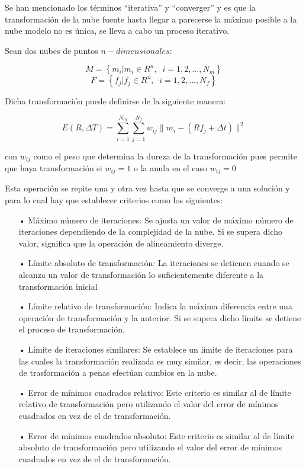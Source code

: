 Se han mencionado los términos ``iterativa'' y ``converger'' y es que la transformación de la nube fuente hasta llegar a parecerse la máximo posible a la nube modelo no es única, se lleva a cabo un proceso iterativo. 

Sean dos nubes de puntos $n-dimensionales$:

$$M=\left\lbrace m_{i} | m_{i} \in R^n,\;\;i=1,2,...,N_{m} \right\rbrace$$
$$F=\left\lbrace f_{j} | f_{j} \in R^n,\;\;i=1,2,...,N_{f} \right\rbrace$$

Dicha transformación puede definirse de la siguiente manera:

$$E(R,\Delta T)=\sum_{i=1}^{N_m} \sum_{j=1}^{N_f} w_{ij} \| m_{i}-(Rf_{j}+\Delta t)  \|^2$$


con $w_{ij}$ como el peso que determina la dureza de la transformación pues permite que haya transformación si $w_{ij}=1$ o la anula en el caso $w_{ij}=0$

Esta operación se repite una y otra vez hasta que se converge a una solución y para lo cual hay que establecer criterios como los siguientes:

\begin{itemize}
\item[•]Máximo número de iteraciones:
Se ajusta un valor de máximo número de iteraciones dependiendo de la complejidad de la nube. Si se supera dicho valor, significa que la operación de alineamiento diverge.
\item[•]Límite absoluto de transformación: 
La iteraciones se detienen cuando se alcanza un valor de transformación lo suficientemente diferente a la transformación inicial
\item[•]Límite relativo de transformación:
Indica la máxima diferencia entre una operación de transformación y la anterior. Si se supera dicho límite se detiene el proceso de transformación.
\item[•]Límite de iteraciones similares: 
Se establece un límite de iteraciones para las cuales la transformación realizada es muy similar, es decir, las operaciones de trasformación a penas efectúan cambios en la nube.
\item[•]Error de mínimos cuadrados relativo:
Este criterio es similar al de límite relativo de transformación pero utilizando el valor del error de mínimos cuadrados en vez de el de transformación.
\item[•]Error de mínimos cuadrados absoluto:
Este criterio es similar al de límite absoluto de transformación pero utilizando el valor del error de mínimos cuadrados en vez de el de transformación.
\end{itemize}

